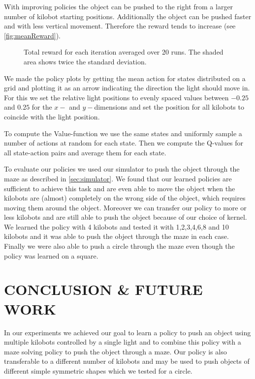\documentclass[twoside]{article}
\begin{document}
With improving policies the object can be pushed to the right from a larger
number of kilobot starting positions. Additionally the object can be pushed
faster and with less vertical movement. Therefore the reward tends to increase
(see \autoref{fig:meanReward}).

\begin{figure}[!htb]
    \centering
    \resizebox{\linewidth}{!}{}
    \caption{Total reward for each iteration averaged over 20 runs. The shaded
             area shows twice the standard deviation.}
    \label{fig:meanReward}
\end{figure}

We made the policy plots by getting the mean action for states distributed on a
grid and plotting it as an arrow indicating the direction the light should move
in. For this we set the relative light positions to evenly spaced values between
$-0.25$ and $0.25$ for the $x-$ and $y-$dimensions and set the position for all
kilobots to coincide with the light position.

To compute the Value-function we use the same states and uniformly sample a
number of actions at random for each state. Then we compute the Q-values for all
state-action pairs and average them for each state.

To evaluate our policies we used our simulator to push the object through the
maze as described in \ref{sec:simulator}. We found that our learned policies are
sufficient to achieve this task and are even able to move the object when the
kilobots are (almost) completely on the wrong side of the object, which requires
moving them around the object. Moreover we can transfer our policy to more or
less kilobots and are still able to push the object because of our choice of
kernel. We learned the policy with 4 kilobots and tested it with 1,2,3,4,6,8 and
10 kilobots and it was able to push the object through the maze in each case.
Finally we were also able to push a circle through the maze even though the
policy was learned on a square.

\section{CONCLUSION \& FUTURE WORK}

In our experiments we achieved our goal to learn a policy to push an object
using multiple kilobots controlled by a single light and to combine this policy
with a maze solving policy to push the object through a maze. Our policy is also
transferable to a different number of kilobots and may be used to push objects of
different simple symmetric shapes which we tested for a circle.
\end{document}
